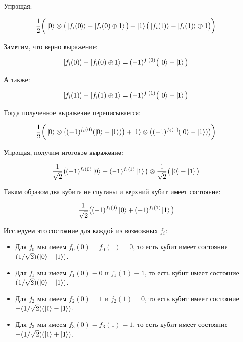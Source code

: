 \documentclass[a4paper, 12pt]{article}
\begin{document}
Упрощая:

\begin{equation}
	\frac{1}{2}\bigg(\ket{0} \otimes \big(\ket{f_i(0)} - \ket{f_i(0) \oplus 1}\big) + \ket{1} \big(\ket{f_i(1)} - \ket{f_i(1)} \oplus 1\big) \bigg)
\end{equation}

Заметим, что верно выражение:

\begin{equation}
	\ket{f_i(0)} - \ket{f_i(0) \oplus 1} = (-1)^{f_i(0)} \big(\ket{0} - \ket{1}\big)
\end{equation}

А также:

\begin{equation}
	\ket{f_i(1)} - \ket{f_i(1) \oplus 1} = (-1)^{f_i(1)} \big(\ket{0} - \ket{1}\big)
\end{equation}

Тогда полученное выражение переписывается:

\begin{equation}
	\frac{1}{2}\bigg(\ket{0} \otimes \big((-1)^{f_i(0)}(\ket{0} - \ket{1})\big) + \ket{1} \otimes \big((-1)^{f_i(1)}(\ket{0} - \ket{1})\big)\bigg)
\end{equation}

Упрощая, получим итоговое выражение:

\begin{equation}
	\frac{1}{\sqrt{2}} \big((-1)^{f_i(0)}\ket{0} + (-1)^{f_i(1)}\ket{1}\big) \otimes \frac{1}{\sqrt{2}} \big(\ket{0} - \ket{1}\big)
\end{equation}

Таким образом два кубита не спутаны и верхний кубит имеет состояние:

\begin{equation}
	\frac{1}{\sqrt{2}} \big((-1)^{f_i(0)}\ket{0} + (-1)^{f_i(1)}\ket{1}\big)
\end{equation}

Исследуем это состояние для каждой из возможных $f_i$:

\begin{itemize}
	\item Для $f_0$ мы имеем $f_0(0) = f_0(1) = 0$, то есть кубит имеет состояние $(1/\sqrt{2}) (\ket{0} + \ket{1})$.
	
	\item Для $f_1$ мы имеем $f_1(0) = 0$ и $f_1(1) = 1$, то есть кубит имеет состояние $(1/\sqrt{2}) (\ket{0} - \ket{1})$.
	
	\item Для $f_2$ мы имеем $f_2(0) = 1$ и $f_2(1) = 0$, то есть кубит имеет состояние $-(1/\sqrt{2}) (\ket{0} - \ket{1})$.
	
	\item Для $f_3$ мы имеем $f_3(0) = f_3(1) = 1$, то есть кубит имеет состояние $-(1/\sqrt{2}) (\ket{0} + \ket{1})$.
\end{itemize}
\end{document}
